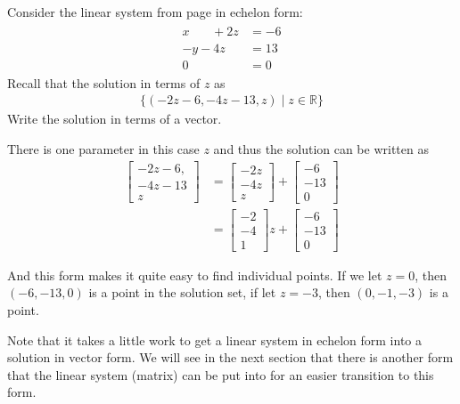 \begin{example}
Consider the linear system  from page \pageref{ex:many:solutions} in echelon form:
%
\begin{align*}
\begin{split}
x\phantom{+2y} + 2z & = -6 \\
-y -4z & = 13 \\
0 & = 0
\end{split}
\end{align*}
Recall that the solution in terms of $z$ as
\begin{align*}
\{ (-2z-6, -4z-13,z) \; | \; z \in \mathbb{R} \}
\end{align*}
Write the solution in terms of a vector.

\solution

There is one parameter in this case $z$ and thus the solution can be written as
%
\begin{align*}
\begin{bmatrix}
-2z-6, \\ -4z-13 \\ z
\end{bmatrix} & = \begin{bmatrix}
-2z \\ -4z \\ z
\end{bmatrix} + \begin{bmatrix}
-6 \\ -13 \\ 0
\end{bmatrix} \\
& = \begin{bmatrix}
-2 \\ -4 \\ 1
\end{bmatrix} z + \begin{bmatrix}
-6 \\ -13 \\ 0
\end{bmatrix}
\end{align*}

And this form makes it quite easy to find individual points.  If we let $z=0$, then $(-6,-13,0)$ is a point in the solution set, if let $z=-3$, then $(0,-1,-3)$ is a point.


\end{example}


Note that it takes a little work to get a linear system in echelon form into a solution in vector form.  We will see in the next section that there is another form that the linear system (matrix) can be put into for an easier transition to this form.


